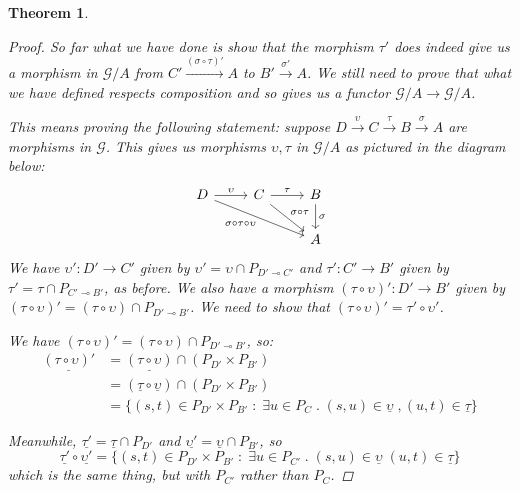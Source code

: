 \documentclass[11pt]{article} %
\theoremstyle{plain} %
\newtheorem{theorem}{Theorem}[section]
\theoremstyle{definition} %
\theoremstyle{note}
\theoremstyle{exercisestyle}
\newcommand{\map}[3]{#2\xrightarrow{#1} #3}
\newcommand*\from{\colon}
\newcommand{\cmap}[3]{#1\from{}#2\to{}#3}
\renewcommand{\implies}{\multimap}
\newcommand{\comp}[2]{#1 \circ #2}
\newcommand{\G}{\mathcal G}
\newcommand{\suchthat}{\;\colon\;}
\newcommand{\esuchthat}{\;.\;}
\newcommand{\grel}[1]{\underline{#1}}
\begin{document}
\begin{theorem}
\begin{proof}
     So far what we have done is show that the morphism $\tau'$ does indeed give us a morphism in $\G/A$ from $\map{(\comp\sigma\tau)'}{C'}{A}$ to $\map{\sigma'}{B'}{A}$.  We still need to prove that what we have defined respects composition and so gives us a functor $\G/A\to \G/A$.

     This means proving the following statement: suppose $\map{\upsilon}{D}{C}\xrightarrow{\tau}\map{\sigma}{B}{A}$ are morphisms in $\G$.  This gives us morphisms $\upsilon,\tau$ in $\G/A$ as pictured in the diagram below:
    \[
      \begin{tikzcd}
        D \arrow[r, "\upsilon"] \arrow[drr, "\comp{\sigma}{\comp{\tau}{\upsilon}}"']
          & C \arrow[r, "\tau"] \arrow[dr, "\comp\sigma\tau"]
            & B \arrow[d, "\sigma"] \\
          &
            & A
      \end{tikzcd}
      \]
    We have $\cmap{\upsilon'}{D'}{C'}$ given by $\upsilon'=\upsilon\cap P_{D'\implies C'}$ and $\cmap{\tau'}{C'}{B'}$ given by $\tau'=\tau\cap P_{C'\implies B'}$, as before.  We also have a morphism $\cmap{(\comp\tau\upsilon)'}{D'}{B'}$ given by $(\comp\tau\upsilon)'=(\comp\tau\upsilon)\cap P_{D'\implies B'}$.  We need to show that $(\comp\tau\upsilon)'=\comp{\tau'}{\upsilon'}$.

    We have $(\comp\tau\upsilon)'=(\comp\tau\upsilon)\cap P_{D'\implies B'}$, so:
    \begin{align*}
      \grel{(\comp\tau\upsilon)'} & = \grel{(\comp\tau\upsilon)}\cap(P_{D'}\times P_{B'}) \\
       & = (\comp{\grel\tau}{\grel\upsilon}) \cap (P_{D'}\times P_{B'}) \\
       & = \{(s,t)\in P_{D'}\times P_{B'} \suchthat \exists u\in P_C \esuchthat (s,u) \in \grel\upsilon\;, (u,t) \in \grel\tau \}
    \end{align*}

    Meanwhile, $\grel{\tau '} = \grel\tau \cap P_{D'}$ and $\grel{\upsilon '} = \grel\upsilon \cap P_{B'}$, so
    \[
      \comp{\grel{\tau '}}{\grel{\upsilon '}} = \{(s,t) \in P_{D'}\times P_{B'} \suchthat \exists u\in P_{C'} \esuchthat (s,u) \in \grel\upsilon\; (u,t)\in \grel\tau \}
      \]
    which is the same thing, but with $P_{C'}$ rather than $P_C$.  


\end{proof}
\end{theorem}
\end{document}
